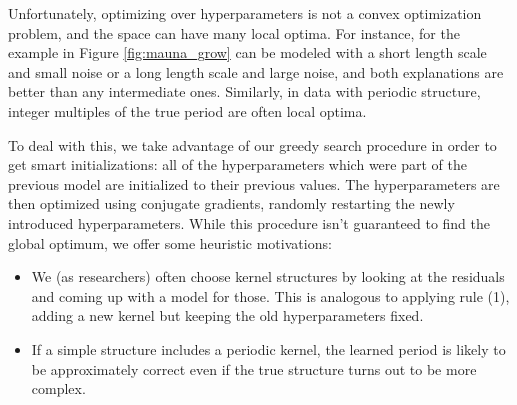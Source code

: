 \documentclass[twoside]{article}
\begin{document}
Unfortunately, optimizing over hyperparameters is not a convex optimization problem, and the space can have many local optima.
For instance, for the example in Figure \ref{fig:mauna_grow} can be modeled with a short length scale and small noise or a long length scale and large noise, and both explanations are better than any intermediate ones.
Similarly, in data with periodic structure, integer multiples of the true period are often local optima. 

To deal with this, we take advantage of our greedy search procedure in order to get smart initializations: all of the hyperparameters which were part of the previous model are initialized to their previous values.
The hyperparameters are then optimized using conjugate gradients, randomly restarting the newly introduced hyperparameters.
While this procedure isn't guaranteed to find the global optimum, we offer some heuristic motivations:
\begin{itemize}
\item We (as researchers) often choose kernel structures by looking at the residuals and coming up with a model for those. This is analogous to applying rule (1), adding a new kernel but keeping the old hyperparameters fixed.
\item If a simple structure includes a periodic kernel, the learned period is likely to be approximately correct even if the true structure turns out to be more complex.
\end{itemize}






\end{document}
